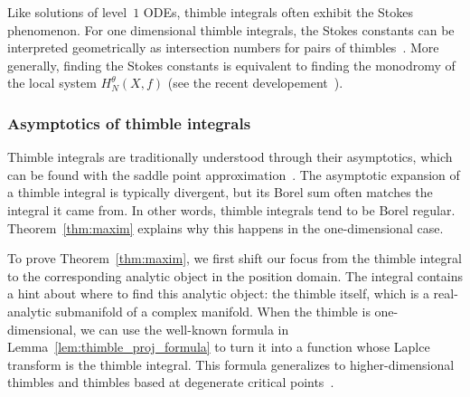 \documentclass{article}
\theoremstyle{definition}
\theoremstyle{plain}
\newenvironment{revised}{\color{DarkBlue}}{\color{black}}
\begin{document}
Like solutions of level~$1$ ODEs, thimble integrals often exhibit the Stokes phenomenon. For one dimensional thimble integrals, the Stokes constants can be interpreted geometrically as intersection numbers for pairs of thimbles~\cite{kontsevich2022analyticity}. More generally, finding the Stokes constants is equivalent to finding the monodromy of the local system $H^\theta_N(X,f)$ (see the recent developement~\cite{kontsevich2024holomorphic}). 
\color{black}
%
\subsubsection{Asymptotics of thimble integrals}
%
\begin{revised}
Thimble integrals are traditionally understood through their asymptotics, which can be found with the saddle point approximation~\cite{andersen2020resurgence,delabaere-howls,delabaere_dillinger_pham,Delabaere-Pham99,dingle1973asymptotic,Malgrange22,Pham83}. The asymptotic expansion of a thimble integral is typically divergent, but its Borel sum often matches the integral it came from. In other words, thimble integrals tend to be Borel regular. Theorem~\ref{thm:maxim} explains why this happens in the one-dimensional case.

To prove Theorem~\ref{thm:maxim}, we first shift our focus from the thimble integral to the corresponding analytic object in the position domain. The integral contains a hint about where to find this analytic object: the thimble itself, which is a real-analytic submanifold of a complex manifold. When the thimble is one-dimensional, we can use the well-known formula in Lemma~\ref{lem:thimble_proj_formula} to turn it into a function whose Laplce transform is the thimble integral. This formula generalizes to higher-dimensional thimbles and thimbles based at degenerate critical points~\cite[Section 1.2.2]{mistegard_phdthesis}.\end{revised}
\end{document}
